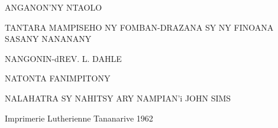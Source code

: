 
ANGANON'NY NTAOLO

TANTARA MAMPISEHO NY FOMBAN-DRAZANA SY NY FINOANA SASANY NANANANY

NANGONIN-dREV.
L. DAHLE

NATONTA FANIMPITONY

NALAHATRA SY NAHITSY ARY NAMPIAN'i JOHN SIMS

Imprimerie Lutherienne
Tananarive
1962